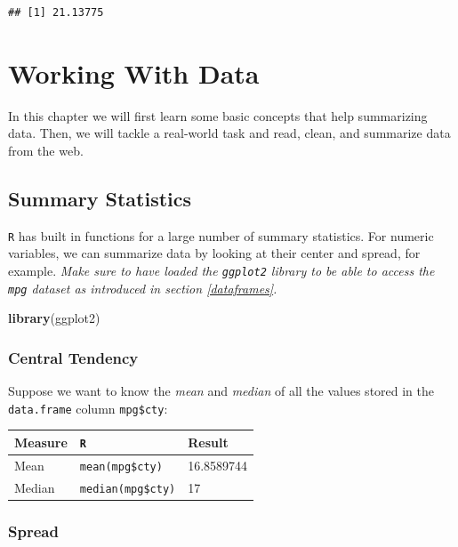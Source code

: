 \documentclass[]{book}
\newenvironment{Shaded}{\begin{snugshade}}{\end{snugshade}}
\newcommand{\KeywordTok}[1]{\textcolor[rgb]{0.13,0.29,0.53}{\textbf{#1}}}
\newcommand{\NormalTok}[1]{#1}
\theoremstyle{definition}
\theoremstyle{definition}
\theoremstyle{definition}
\theoremstyle{remark}
\begin{document}
\begin{verbatim}
## [1] 21.13775
\end{verbatim}

\chapter{Working With Data}\label{sum}

In this chapter we will first learn some basic concepts that help
summarizing data. Then, we will tackle a real-world task and read,
clean, and summarize data from the web.

\section{Summary Statistics}\label{summary-statistics}

\texttt{R} has built in functions for a large number of summary
statistics. For numeric variables, we can summarize data by looking at
their center and spread, for example. \emph{Make sure to have loaded the
\texttt{ggplot2} library to be able to access the \texttt{mpg} dataset
as introduced in section \ref{dataframes}.}

\begin{Shaded}
\begin{Highlighting}[]
\KeywordTok{library}\NormalTok{(ggplot2)}
\end{Highlighting}
\end{Shaded}

\subsection*{Central Tendency}\label{central-tendency}

Suppose we want to know the \emph{mean} and \emph{median} of all the
values stored in the \texttt{data.frame} column \texttt{mpg\$cty}:

\begin{longtable}[]{@{}lll@{}}
\toprule
Measure & \texttt{R} & Result\tabularnewline
\midrule
\endhead
Mean & \texttt{mean(mpg\$cty)} & 16.8589744\tabularnewline
Median & \texttt{median(mpg\$cty)} & 17\tabularnewline
\bottomrule
\end{longtable}

\subsection*{Spread}\label{spread}
\end{document}
